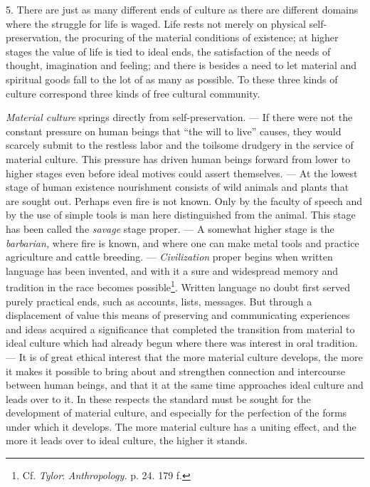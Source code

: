 \documentclass[12pt,a4paper,openany]{book}
\newcommand{\opage}[1]{\marginnote{\footnotesize\textit{[#1]}}}
\begin{document}
5. There are just as many different ends of culture as there are different domains where the struggle for life is
waged. Life rests not merely on physical self-preservation, the procuring of the material conditions of existence; at
higher stages the value of life is tied to ideal ends, the satisfaction of the needs of thought, imagination and feeling;
and there is besides a need to let material and spiritual goods fall to the lot of as many as possible. To these three
kinds of culture correspond three kinds of free cultural community.

\textit{Material culture} springs directly from self-preservation. --- If there were not the constant pressure on human
beings that ``the will to live'' causes, they would scarcely submit to the restless labor and the toilsome drudgery in
the service of material culture. This pressure has driven human beings forward from lower to higher stages even before
ideal motives could assert themselves. --- At the lowest stage of human existence nourishment consists of wild animals
and plants that are sought out. Perhaps even fire is not known. Only by the faculty of speech and by the use of simple
tools is man here distinguished from the animal. This stage has been called the \textit{savage} stage proper. --- A
somewhat higher stage is the \textit{barbarian,} where fire is known,
\opage{357}and where one can make metal tools and practice agriculture and cattle breeding. --- \textit{Civilization}
proper begins when written language has been invented, and with it a sure and widespread memory and tradition in the race
becomes possible\footnote[1]{Cf. \emph{Tylor}: \textit{Anthropology.} p. 24. 179 f.}. Written language no doubt first
served purely practical ends, such as accounts, lists, messages. But through a displacement of value this means of
preserving and communicating experiences and ideas acquired a significance that completed the transition from material
to ideal culture which had already begun where there was interest in oral tradition. --- It is of great ethical interest
that the more material culture develops, the more it makes it possible to bring about and strengthen connection and
intercourse between human beings, and that it at the same time approaches ideal culture and leads over to it. In these
respects the standard must be sought for the development of material culture, and especially for the perfection of the
forms under which it develops. The more material culture has a uniting effect, and the more it leads over to ideal
culture, the higher it stands.
\end{document}

